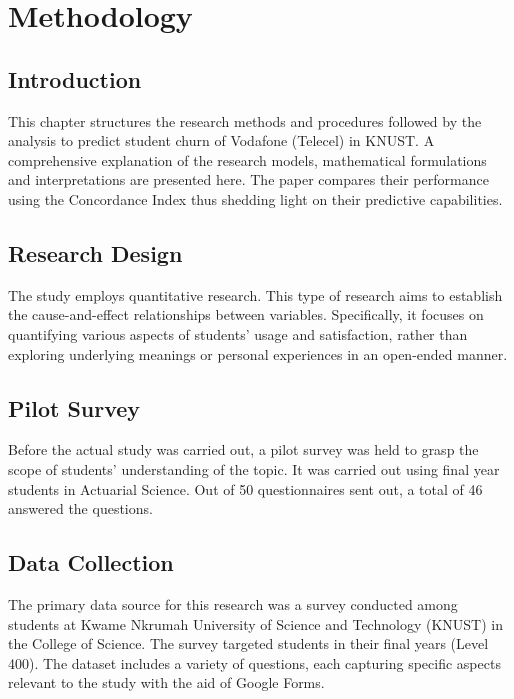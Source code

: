 \documentclass[doublespacing,12pt]{report}
\begin{document}
\newpage
\chapter{Methodology}

\section{Introduction}

This chapter structures the research methods and procedures followed by the analysis to predict student churn of Vodafone (Telecel) in KNUST. A comprehensive explanation of the research models, mathematical formulations and interpretations are presented here. The paper compares their performance using the Concordance Index thus shedding light on their predictive capabilities.

\section{Research Design}

The study employs quantitative research. This type of research aims to establish the cause-and-effect relationships between variables. Specifically, it focuses on quantifying various aspects of students’ usage and satisfaction, rather than exploring underlying meanings or personal experiences in an open-ended manner.

\section{Pilot Survey}

Before the actual study was carried out, a pilot survey was held to grasp the scope of students’ understanding of the topic. It was carried out using final year students in Actuarial Science. Out of 50 questionnaires sent out, a total of 46 answered the questions.
\section{Data Collection}

The primary data source for this research was a survey conducted among students at Kwame Nkrumah University of Science and Technology (KNUST) in the College of Science. The survey targeted students in their final years (Level 400). The dataset includes a variety of questions, each capturing specific aspects relevant to the study with the aid of Google Forms.
\end{document}
